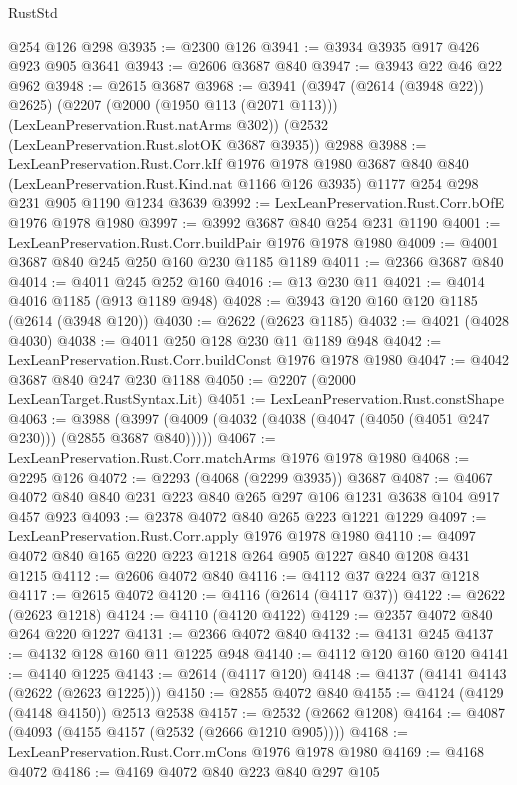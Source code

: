 \begin{lexlean}{RustStd}
\begin{coremodule}
    @254
    @126
    @298
@3935 := @2300 @126
@3941 := @3934 @3935 @917 @426 @923 @905 @3641
@3943 := @2606 @3687 @840
@3947 := @3943 @22 @46 @22 @962
@3948 := @2615 @3687
@3968 := @3941
    (@3947 (@2614 (@3948 @22)) @2625)
    (@2207 (@2000 (@1950 @113 (@2071 @113))) (LexLeanPreservation.Rust.natArms @302))
    (@2532 (LexLeanPreservation.Rust.slotOK @3687 @3935))
    @2988
@3988 := LexLeanPreservation.Rust.Corr.kIf
    @1976
    @1978
    @1980
    @3687
    @840
    @840
    (LexLeanPreservation.Rust.Kind.nat @1166 @126 @3935)
    @1177
    @254
    @298
    @231
    @905
    @1190
    @1234
    @3639
@3992 := LexLeanPreservation.Rust.Corr.bOfE @1976 @1978 @1980
@3997 := @3992 @3687 @840 @254 @231 @1190
@4001 := LexLeanPreservation.Rust.Corr.buildPair @1976 @1978 @1980
@4009 := @4001 @3687 @840 @245 @250 @160 @230 @1185 @1189
@4011 := @2366 @3687 @840
@4014 := @4011 @245 @252 @160
@4016 := @13 @230 @11
@4021 := @4014 @4016 @1185 (@913 @1189 @948)
@4028 := @3943 @120 @160 @120 @1185 (@2614 (@3948 @120))
@4030 := @2622 (@2623 @1185)
@4032 := @4021 (@4028 @4030)
@4038 := @4011 @250 @128 @230 @11 @1189 @948
@4042 := LexLeanPreservation.Rust.Corr.buildConst @1976 @1978 @1980
@4047 := @4042 @3687 @840 @247 @230 @1188
@4050 := @2207 (@2000 LexLeanTarget.RustSyntax.Lit)
@4051 := LexLeanPreservation.Rust.constShape
@4063 := @3988 (@3997 (@4009 (@4032 (@4038 (@4047 (@4050 (@4051 @247 @230))) (@2855 @3687 @840)))))
@4067 := LexLeanPreservation.Rust.Corr.matchArms @1976 @1978 @1980
@4068 := @2295 @126
@4072 := @2293 (@4068 (@2299 @3935)) @3687
@4087 := @4067 @4072 @840 @840 @231 @223 @840 @265 @297 @106 @1231 @3638 @104 @917 @457 @923
@4093 := @2378 @4072 @840 @265 @223 @1221 @1229
@4097 := LexLeanPreservation.Rust.Corr.apply @1976 @1978 @1980
@4110 := @4097 @4072 @840 @165 @220 @223 @1218 @264 @905 @1227 @840 @1208 @431 @1215
@4112 := @2606 @4072 @840
@4116 := @4112 @37 @224 @37 @1218
@4117 := @2615 @4072
@4120 := @4116 (@2614 (@4117 @37))
@4122 := @2622 (@2623 @1218)
@4124 := @4110 (@4120 @4122)
@4129 := @2357 @4072 @840 @264 @220 @1227
@4131 := @2366 @4072 @840
@4132 := @4131 @245
@4137 := @4132 @128 @160 @11 @1225 @948
@4140 := @4112 @120 @160 @120
@4141 := @4140 @1225
@4143 := @2614 (@4117 @120)
@4148 := @4137 (@4141 @4143 (@2622 (@2623 @1225)))
@4150 := @2855 @4072 @840
@4155 := @4124 (@4129 (@4148 @4150)) @2513 @2538
@4157 := @2532 (@2662 @1208)
@4164 := @4087 (@4093 (@4155 @4157 (@2532 (@2666 @1210 @905))))
@4168 := LexLeanPreservation.Rust.Corr.mCons @1976 @1978 @1980
@4169 := @4168 @4072
@4186 := @4169
    @4072
    @840
    @223
    @840
    @297
    @105

\end{coremodule}
\end{lexlean}
